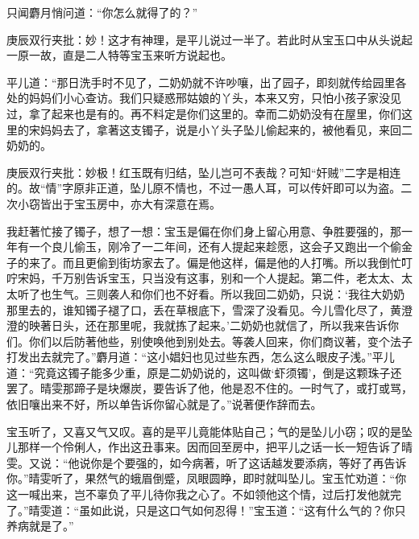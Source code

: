 \begin{parag}


    只闻麝月悄问道：“你怎么就得了的？”\begin{note}庚辰双行夹批：妙！这才有神理，是平儿说过一半了。若此时从宝玉口中从头说起一原一故，直是二人特等宝玉来听方说起也。\end{note}平儿道：“那日洗手时不见了，二奶奶就不许吵嚷，出了园子，即刻就传给园里各处的妈妈们小心查访。我们只疑惑邢姑娘的丫头，本来又穷，只怕小孩子家没见过，拿了起来也是有的。再不料定是你们这里的。幸而二奶奶没有在屋里，你们这里的宋妈妈去了，拿著这支镯子，说是小丫头子坠儿偷起来的，被他看见，来回二奶奶的。\begin{note}庚辰双行夹批：妙极！红玉既有归结，坠儿岂可不表哉？可知“奸贼”二字是相连的。故“情”字原非正道，坠儿原不情也，不过一愚人耳，可以传奸即可以为盗。二次小窃皆出于宝玉房中，亦大有深意在焉。\end{note}我赶著忙接了镯子，想了一想：宝玉是偏在你们身上留心用意、争胜要强的，那一年有一个良儿偷玉，刚冷了一二年间，还有人提起来趁愿，这会子又跑出一个偷金子的来了。而且更偷到街坊家去了。偏是他这样，偏是他的人打嘴。所以我倒忙叮咛宋妈，千万别告诉宝玉，只当没有这事，别和一个人提起。第二件，老太太、太太听了也生气。三则袭人和你们也不好看。所以我回二奶奶，只说：‘我往大奶奶那里去的，谁知镯子褪了口，丢在草根底下，雪深了没看见。今儿雪化尽了，黄澄澄的映著日头，还在那里呢，我就拣了起来。’二奶奶也就信了，所以我来告诉你们。你们以后防著他些，别使唤他到别处去。等袭人回来，你们商议著，变个法子打发出去就完了。”麝月道：“这小娼妇也见过些东西，怎么这么眼皮子浅。”平儿道：“究竟这镯子能多少重，原是二奶奶说的，这叫做‘虾须镯’，倒是这颗珠子还罢了。晴雯那蹄子是块爆炭，要告诉了他，他是忍不住的。一时气了，或打或骂，依旧嚷出来不好，所以单告诉你留心就是了。”说著便作辞而去。
\end{parag}


\begin{parag}


    宝玉听了，又喜又气又叹。喜的是平儿竟能体贴自己；气的是坠儿小窃；叹的是坠儿那样一个伶俐人，作出这丑事来。因而回至房中，把平儿之话一长一短告诉了晴雯。又说：“他说你是个要强的，如今病著，听了这话越发要添病，等好了再告诉你。”晴雯听了，果然气的蛾眉倒蹙，凤眼圆睁，即时就叫坠儿。宝玉忙劝道：“你这一喊出来，岂不辜负了平儿待你我之心了。不如领他这个情，过后打发他就完了。”晴雯道：“虽如此说，只是这口气如何忍得！”宝玉道：“这有什么气的？你只养病就是了。”
\end{parag}


